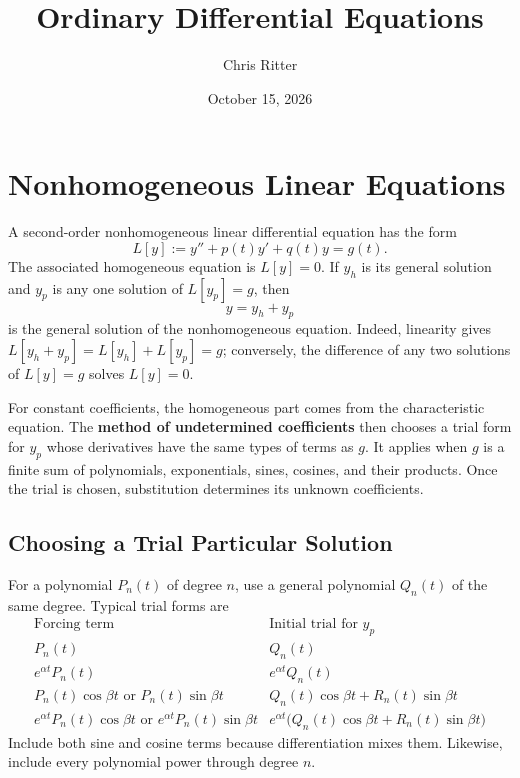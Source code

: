 \documentclass[11pt]{article}
\title{Ordinary Differential Equations}
\author{Chris Ritter}
\date{October 15, 2026}
\begin{document}
\maketitle
\tableofcontents
\newpage

\section{Nonhomogeneous Linear Equations}

A second-order nonhomogeneous linear differential equation has the form
\[
L[y]:=y''+p(t)y'+q(t)y=g(t).
\]
The associated homogeneous equation is \(L[y]=0\). If \(y_h\) is its
general solution and \(y_p\) is any one solution of \(L[y_p]=g\), then
\[
\boxed{y=y_h+y_p}
\]
is the general solution of the nonhomogeneous equation. Indeed,
linearity gives \(L[y_h+y_p]=L[y_h]+L[y_p]=g\); conversely, the
difference of any two solutions of \(L[y]=g\) solves \(L[y]=0\).

For constant coefficients, the homogeneous part comes from the
characteristic equation. The \textbf{method of undetermined
coefficients} then chooses a trial form for \(y_p\) whose derivatives
have the same types of terms as \(g\). It applies when \(g\) is a
finite sum of polynomials, exponentials, sines, cosines, and their
products. Once the trial is chosen, substitution determines its
unknown coefficients.

\subsection{Choosing a Trial Particular Solution}

For a polynomial \(P_n(t)\) of degree \(n\), use a general polynomial
\(Q_n(t)\) of the same degree. Typical trial forms are
\[
\begin{array}{c|c}
\text{Forcing term} & \text{Initial trial for }y_p\\ \hline
P_n(t) & Q_n(t)\\
e^{\alpha t}P_n(t) & e^{\alpha t}Q_n(t)\\
P_n(t)\cos\beta t\text{ or }P_n(t)\sin\beta t
  & Q_n(t)\cos\beta t+R_n(t)\sin\beta t\\
e^{\alpha t}P_n(t)\cos\beta t\text{ or }e^{\alpha t}P_n(t)\sin\beta t
  & e^{\alpha t}\bigl(Q_n(t)\cos\beta t+R_n(t)\sin\beta t\bigr)
\end{array}
\]
Include both sine and cosine terms because differentiation mixes them.
Likewise, include every polynomial power through degree \(n\).
\end{document}
